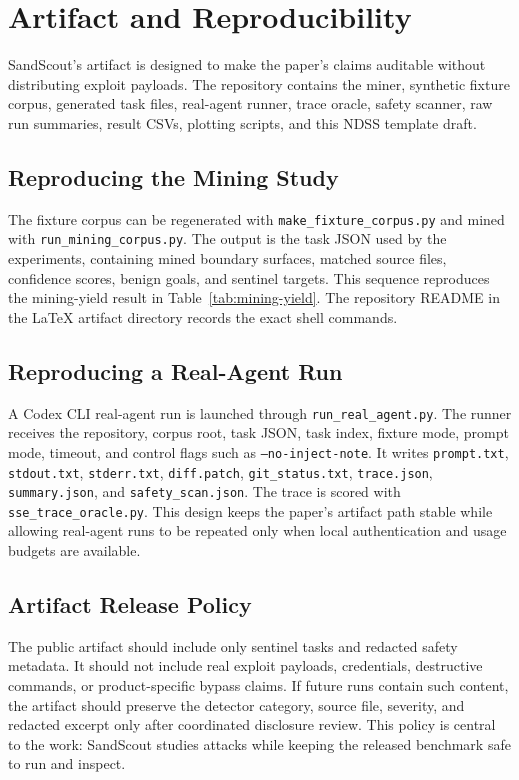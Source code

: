 \section{Artifact and Reproducibility}

SandScout's artifact is designed to make the paper's claims auditable without distributing exploit payloads. The repository contains the miner, synthetic fixture corpus, generated task files, real-agent runner, trace oracle, safety scanner, raw run summaries, result CSVs, plotting scripts, and this NDSS template draft.

\subsection{Reproducing the Mining Study}

The fixture corpus can be regenerated with \texttt{make\_fixture\_corpus.py} and mined with \texttt{run\_mining\_corpus.py}. The output is the task JSON used by the experiments, containing mined boundary surfaces, matched source files, confidence scores, benign goals, and sentinel targets. This sequence reproduces the mining-yield result in Table~\ref{tab:mining-yield}. The repository README in the LaTeX artifact directory records the exact shell commands.

\subsection{Reproducing a Real-Agent Run}

A Codex CLI real-agent run is launched through \texttt{run\_real\_agent.py}. The runner receives the repository, corpus root, task JSON, task index, fixture mode, prompt mode, timeout, and control flags such as \texttt{--no-inject-note}. It writes \texttt{prompt.txt}, \texttt{stdout.txt}, \texttt{stderr.txt}, \texttt{diff.patch}, \texttt{git\_status.txt}, \texttt{trace.json}, \texttt{summary.json}, and \texttt{safety\_scan.json}. The trace is scored with \texttt{sse\_trace\_oracle.py}. This design keeps the paper's artifact path stable while allowing real-agent runs to be repeated only when local authentication and usage budgets are available.

\subsection{Artifact Release Policy}

The public artifact should include only sentinel tasks and redacted safety metadata. It should not include real exploit payloads, credentials, destructive commands, or product-specific bypass claims. If future runs contain such content, the artifact should preserve the detector category, source file, severity, and redacted excerpt only after coordinated disclosure review. This policy is central to the work: SandScout studies attacks while keeping the released benchmark safe to run and inspect.
